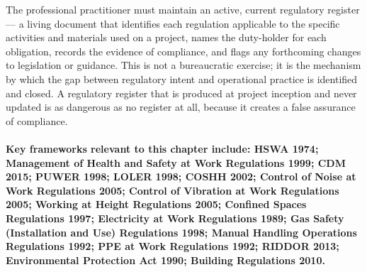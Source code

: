 The professional practitioner must maintain an active, current regulatory register --- a living document that identifies each regulation applicable to the specific activities and materials used on a project, names the duty-holder for each obligation, records the evidence of compliance, and flags any forthcoming changes to legislation or guidance. This is not a bureaucratic exercise; it is the mechanism by which the gap between regulatory intent and operational practice is identified and closed. A regulatory register that is produced at project inception and never updated is as dangerous as no register at all, because it creates a false assurance of compliance.

\paragraph{Key frameworks relevant to this chapter include: HSWA 1974; Management of Health and Safety at Work Regulations 1999; CDM 2015; PUWER 1998; LOLER 1998; COSHH 2002; Control of Noise at Work Regulations 2005; Control of Vibration at Work Regulations 2005; Working at Height Regulations 2005; Confined Spaces Regulations 1997; Electricity at Work Regulations 1989; Gas Safety (Installation and Use) Regulations 1998; Manual Handling Operations Regulations 1992; PPE at Work Regulations 1992; RIDDOR 2013; Environmental Protection Act 1990; Building Regulations 2010.}

